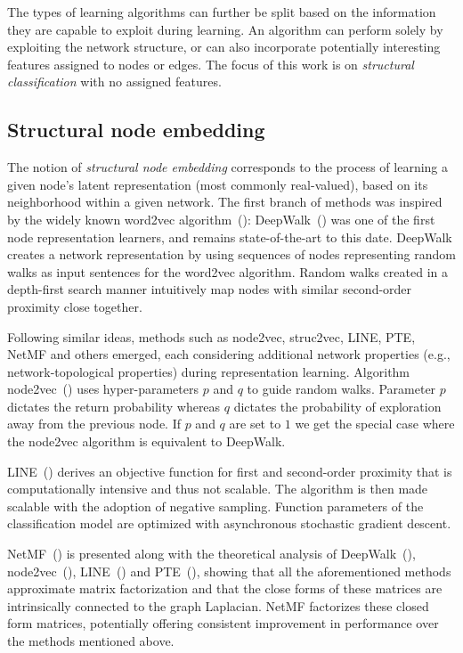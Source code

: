 \documentclass[twoside,11pt]{article}
\begin{document}
The types of learning algorithms can further be split based on the information they are capable to exploit during learning. An algorithm can perform solely by exploiting the network structure, or can also incorporate potentially interesting features assigned to nodes or edges. The focus of this work is on \emph{structural classification} with no assigned features.

\subsection{Structural node embedding}
\label{sec:strucnn}
The notion of \emph{structural node embedding} corresponds to the process of learning a given node's latent representation (most commonly real-valued), based on its neighborhood within a given network. The first branch of methods was inspired by the widely known word2vec algorithm~(\cite{NIPS2013_5021}):  DeepWalk~(\cite{Perozzi2014deepwalk}) was one of the first node representation learners, and remains state-of-the-art to this date. DeepWalk creates a network representation by using sequences of nodes representing random walks as input sentences for the word2vec algorithm. Random walks created in a depth-first search manner intuitively map nodes with similar second-order proximity close together.

Following similar ideas, methods such as node2vec, struc2vec, LINE, PTE, NetMF and others emerged, each considering additional network properties (e.g., network-topological properties) during representation learning. Algorithm node2vec~(\cite{grover2016node2vec}) uses hyper-parameters $p$ and $q$ to guide random walks. Parameter $p$ dictates the return probability whereas $q$ dictates the probability of exploration away from the previous node. If $p$ and $q$ are set to $1$ we get the special case where the node2vec algorithm is equivalent to DeepWalk. 

LINE~(\cite{tang2015line}) derives an objective function for first and second-order proximity that is computationally intensive and thus not scalable. The algorithm is then made scalable with the adoption of negative sampling. Function parameters of the classification model are optimized with asynchronous stochastic gradient descent.

NetMF~(\cite{qiu2018network}) is presented along with the theoretical analysis of DeepWalk~(\cite{Perozzi2014deepwalk}), node2vec~(\cite{grover2016node2vec}), LINE~(\cite{tang2015line}) and PTE~(\cite{Tang2015PTEPT}), showing that all the aforementioned methods approximate matrix factorization and that the close forms of these matrices are intrinsically connected to the graph Laplacian. NetMF factorizes these closed form matrices, potentially offering consistent improvement in performance over the methods mentioned above.
\end{document}
